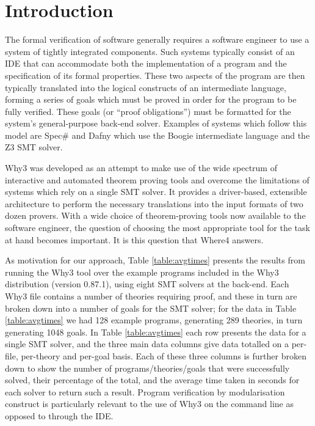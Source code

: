 \documentclass[submission,copyright,creativecommons]{eptcs}
\begin{document}
\section{Introduction}

\label{sec:intro}

The formal verification of software generally requires a software engineer to use a system of tightly integrated components. Such systems typically consist of an IDE that can accommodate both the implementation of a program and the specification of its formal properties. 
These two aspects of the program are then typically translated into the logical constructs of an intermediate language, forming a series of goals which must be proved in order for the program to be fully verified. These goals (or ``proof obligations'') must be formatted for the system's general-purpose back-end solver. Examples of systems which follow this model are Spec\# \cite{spec} and Dafny \cite{Dafny} which use the Boogie \cite{Boogie} intermediate language and the Z3 \cite{Z3} SMT solver. 

\textsf{\textsf{Why3}} \cite{why:whereprograms} was developed as an attempt to make use of the wide spectrum of interactive and automated theorem proving tools and overcome the limitations of systems which rely on a single SMT solver. It provides a driver-based, extensible architecture to perform the necessary translations into the input formats of two dozen provers. With a wide choice of theorem-proving tools now available to the software engineer, the question of choosing the most appropriate tool for the task at hand becomes important. It is this question that \textsf{Where4} answers.

As motivation for our approach, Table \ref{table:avgtimes} presents the results from running the \textsf{Why3} tool over the example programs included in the \textsf{Why3} distribution (version 0.87.1), using eight SMT solvers at the back-end.  
Each \textsf{Why3} file contains a number of theories requiring proof, and these in turn are  broken down into a number of goals for the SMT solver; for the data in Table \ref{table:avgtimes} we had 128 example programs, generating 289 theories, in turn generating 1048 goals.  In Table \ref{table:avgtimes} each row presents the data for a single SMT solver, and the three main data columns give data totalled on a per-file, per-theory and per-goal basis. Each of these three columns is further broken down to show the number of programs/theories/goals that were successfully solved, their percentage of the total, and the average time taken in seconds for each solver to return such a result. Program verification by modularisation construct is particularly relevant to the use of \textsf{Why3} on the command line as opposed to through the IDE.
\end{document}

